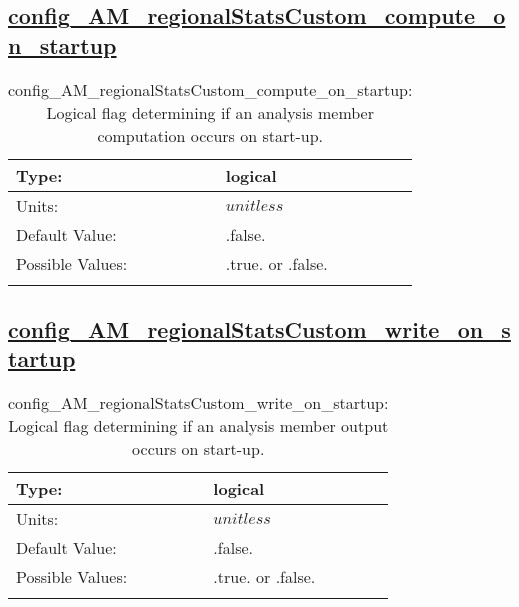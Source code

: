 \subsection[config\_AM\_regionalStatsCustom\_compute\_on\_startup]{\hyperref[sec:nm_tab_AM_regionalStatsCustom]{config\_AM\_regionalStatsCustom\_compute\_on\_startup}}
\label{subsec:nm_sec_config_AM_regionalStatsCustom_compute_on_startup}
\begin{center}
\begin{longtable}{| p{2.0in} || p{4.0in} |}
    \hline
    Type: & logical \\
    \hline
    Units: & $unitless$ \\
    \hline
    Default Value: & .false. \\
    \hline
    Possible Values: & .true. or .false. \\
    \hline
    \caption{config\_AM\_regionalStatsCustom\_compute\_on\_startup: Logical flag determining if an analysis member computation occurs on start-up.}
\end{longtable}
\end{center}
\subsection[config\_AM\_regionalStatsCustom\_write\_on\_startup]{\hyperref[sec:nm_tab_AM_regionalStatsCustom]{config\_AM\_regionalStatsCustom\_write\_on\_startup}}
\label{subsec:nm_sec_config_AM_regionalStatsCustom_write_on_startup}
\begin{center}
\begin{longtable}{| p{2.0in} || p{4.0in} |}
    \hline
    Type: & logical \\
    \hline
    Units: & $unitless$ \\
    \hline
    Default Value: & .false. \\
    \hline
    Possible Values: & .true. or .false. \\
    \hline
    \caption{config\_AM\_regionalStatsCustom\_write\_on\_startup: Logical flag determining if an analysis member output occurs on start-up.}
\end{longtable}
\end{center}
